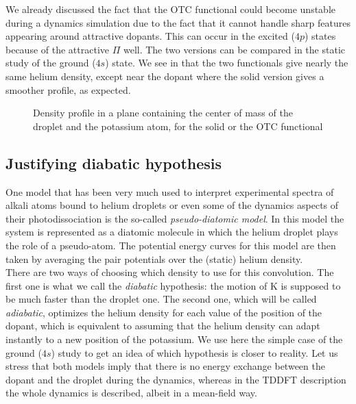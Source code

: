 We already discussed the fact that the OTC functional could become unstable during a dynamics simulation due to the fact that it cannot handle sharp features appearing around attractive dopants. 
This can occur in the excited ($4p$) states because of the attractive $\Pi$ well. 
The two versions can be compared in the static study of the ground ($4s$) state.
We see in  that the two functionals give nearly the same helium density, except near the dopant where the solid version gives a smoother profile, as expected.
\begin{figure}[h]
	\centering
	
	\vspace{-0.5\baselineskip}
	\caption{Density profile in a plane containing the center of mass of the droplet and the potassium atom, for the solid or the OTC functional}
	\label{fig:4S-C-otc-lsolid}
\end{figure}

\subsection{Justifying diabatic hypothesis}

One model that has been very much used to interpret experimental spectra of alkali atoms bound to helium droplets or even some of the dynamics aspects of their photodissociation is the so-called \emph{pseudo-diatomic model}.
In this model the system is represented as a diatomic molecule in which the helium droplet plays the role of a pseudo-atom.
The potential energy curves for this model are then taken by averaging the pair potentials over the (static) helium density. \\

There are two ways of choosing which density to use for this convolution.
The first one is what we call the \textit{diabatic} hypothesis: the motion of K is supposed to be much faster than the droplet one. 
The second one, which will be called \textit{adiabatic}, optimizes the helium density for each value of the position of the dopant, which is equivalent to assuming that the helium density can adapt instantly to a new position of the potassium.
We use here the simple case of the ground ($4s$) study to get an idea of which hypothesis is closer to reality.
Let us stress that both models imply that there is no energy exchange between the dopant and the droplet during the dynamics, whereas in the TDDFT description the whole dynamics is described, albeit in a mean-field way.\\

